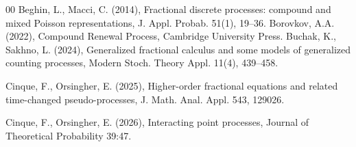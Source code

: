 \documentclass[12pt, twoside, english, headsepline]{article}
\theoremstyle{definition} %
\numberwithin{equation}{section} %
\begin{document}
{\begin{thebibliography}{00}
Beghin, L., Macci, C. (2014), Fractional discrete processes: compound and mixed Poisson representations, J. Appl. Probab. 51(1), 19--36.
%
%
%
Borovkov, A.A. (2022), Compound Renewal Process, Cambridge University Press.
%
%
Buchak, K., Sakhno, L. (2024), Generalized fractional calculus and some models of generalized counting processes, Modern Stoch. Theory Appl. 11(4), 439--458.
%
%
%
%

Cinque, F., Orsingher, E. (2025), Higher-order fractional equations and related time-changed pseudo-processes, J. Math. Anal. Appl. 543, 129026.

Cinque, F., Orsingher, E. (2026), Interacting point processes, Journal of Theoretical Probability 39:47.


\end{thebibliography}}
\end{document}

